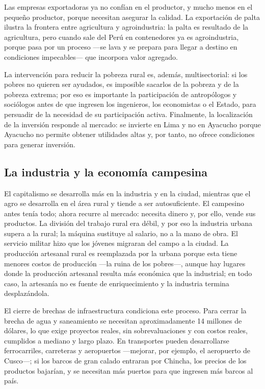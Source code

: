 \documentclass[
  man,
  floatsintext,
  longtable,
  a4paper,
  nolmodern,
  notxfonts,
  notimes,
  12pt,
  colorlinks=true,linkcolor=blue,citecolor=blue,urlcolor=blue]{apa7}
\begin{document}
Las empresas exportadoras ya no confían en el productor, y mucho menos
en el pequeño productor, porque necesitan asegurar la calidad. La
exportación de palta ilustra la frontera entre agricultura y
agroindustria: la palta es resultado de la agricultura, pero cuando sale
del Perú en contenedores ya es agroindustria, porque pasa por un proceso
---se lava y se prepara para llegar a destino en condiciones
impecables--- que incorpora valor agregado.

La intervención para reducir la pobreza rural es, además,
multisectorial: si los pobres no quieren ser ayudados, es imposible
sacarlos de la pobreza y de la pobreza extrema; por eso es importante la
participación de antropólogos y sociólogos antes de que ingresen los
ingenieros, los economistas o el Estado, para persuadir de la necesidad
de su participación activa. Finalmente, la localización de la inversión
responde al mercado: se invierte en Lima y no en Ayacucho porque
Ayacucho no permite obtener utilidades altas y, por tanto, no ofrece
condiciones para generar inversión.

\subsection{La industria y la economía
campesina}\label{la-industria-y-la-economuxeda-campesina}

El capitalismo se desarrolla más en la industria y en la ciudad,
mientras que el agro se desarrolla en el área rural y tiende a ser
autosuficiente. El campesino antes tenía todo; ahora recurre al mercado:
necesita dinero y, por ello, vende sus productos. La división del
trabajo rural era débil, y por eso la industria urbana supera a la
rural; la máquina sustituye al salario, no a la mano de obra. El
servicio militar hizo que los jóvenes migraran del campo a la ciudad. La
producción artesanal rural es reemplazada por la urbana porque esta
tiene menores costos de producción ---la ruina de los pobres---, aunque
hay lugares donde la producción artesanal resulta más económica que la
industrial; en todo caso, la artesanía no es fuente de enriquecimiento y
la industria termina desplazándola.

El cierre de brechas de infraestructura condiciona este proceso. Para
cerrar la brecha de agua y saneamiento se necesitan aproximadamente 14
millones de dólares, lo que exige proyectos reales, sin sobrevaluaciones
y con costos reales, cumplidos a mediano y largo plazo. En transportes
pueden desarrollarse ferrocarriles, carreteras y aeropuertos ---mejorar,
por ejemplo, el aeropuerto de Cusco---; si los barcos de gran calado
entraran por Chincha, los precios de los productos bajarían, y se
necesitan más puertos para que ingresen más barcos al país.
\end{document}
